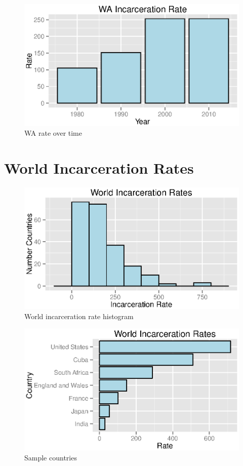 \documentclass{exam}
\begin{document}
  \begin{figure}[H]
    \centering
    \includegraphics[scale = 0.9]{figures/wa_rate_over_time.eps}
    \caption{WA rate over time}
  \end{figure}

  \section{World Incarceration Rates}
  \begin{figure}[H]
    \centering
    \includegraphics[scale = 0.9]{figures/wold_histogram.eps}
    \caption{World incarceration rate histogram}
  \end{figure}

  \begin{figure}[H]
    \centering
    \includegraphics[scale = 0.9]{figures/sample_world_rates.eps}
    \caption{Sample countries}
  \end{figure}
\end{document}
